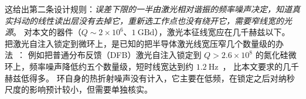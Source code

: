 这给出第二条设计规则：\emph{误差下限的一半由激光相对谐振的频率噪声决定，知道真实抖动的线性读出层没有去掉它，重新选工作点也没有绕开它，需要窄线宽的光源}。
对本文的器件（$Q\sim2\times10^{6}$、$1~\mathrm{GBd}$），激光本征线宽应在几千赫兹以下。
把激光自注入锁定到微环上，是已知的把半导体激光线宽压窄几个数量级的办法~\cite{shen2020,jin2021}：
例如把普通分布反馈（DFB）激光自注入锁定到 $Q>2.6\times10^{8}$ 的氮化硅微环上，频率噪声降低约五个数量级，短时线宽达到约 $1.2~\mathrm{Hz}$~\cite{jin2021}，
比本文要求的几千赫兹低得多。
环自身的热折射噪声没有计入，它主要在低频，在锁定之后对纳秒尺度的影响预计较小，但需要单独核实。
